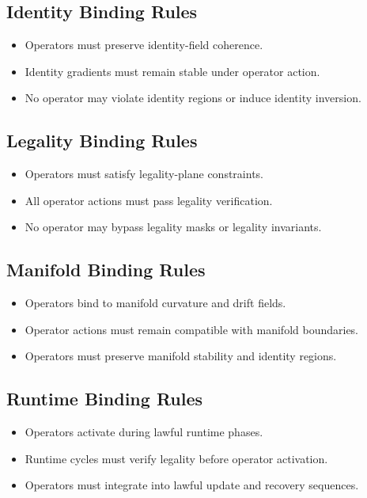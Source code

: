 \subsection{Identity Binding Rules}
\begin{itemize}
    \item Operators must preserve identity-field coherence.
    \item Identity gradients must remain stable under operator action.
    \item No operator may violate identity regions or induce identity inversion.
\end{itemize}

\subsection{Legality Binding Rules}
\begin{itemize}
    \item Operators must satisfy legality-plane constraints.
    \item All operator actions must pass legality verification.
    \item No operator may bypass legality masks or legality invariants.
\end{itemize}

\subsection{Manifold Binding Rules}
\begin{itemize}
    \item Operators bind to manifold curvature and drift fields.
    \item Operator actions must remain compatible with manifold boundaries.
    \item Operators must preserve manifold stability and identity regions.
\end{itemize}

\subsection{Runtime Binding Rules}
\begin{itemize}
    \item Operators activate during lawful runtime phases.
    \item Runtime cycles must verify legality before operator activation.
    \item Operators must integrate into lawful update and recovery sequences.
\end{itemize}

